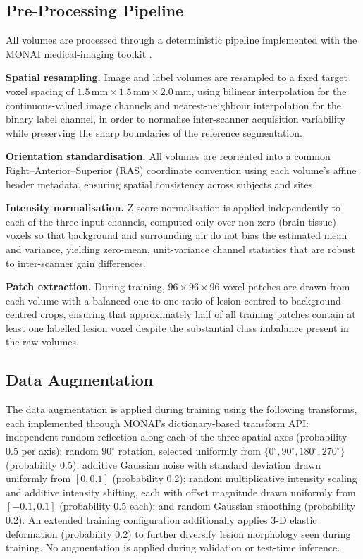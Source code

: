 \documentclass[pdflatex,sn-mathphys-num]{sn-jnl}
\begin{document}
\subsection{Pre-Processing Pipeline}\label{ssec:preproc}
All volumes are processed through a deterministic pipeline implemented
with the MONAI medical-imaging toolkit \citep{cardoso2022monai}.

\textbf{Spatial resampling.} Image and label volumes are resampled to
a fixed target voxel spacing of $1.5\,\text{mm} \times
1.5\,\text{mm} \times 2.0\,\text{mm}$, using bilinear interpolation
for the continuous-valued image channels and nearest-neighbour
interpolation for the binary label channel, in order to normalise
inter-scanner acquisition variability while preserving the sharp
boundaries of the reference segmentation.

\textbf{Orientation standardisation.} All volumes are reoriented into
a common Right--Anterior--Superior (RAS) coordinate convention using
each volume's affine header metadata, ensuring spatial consistency
across subjects and sites.

\textbf{Intensity normalisation.} Z-score normalisation is applied
independently to each of the three input channels, computed only over
non-zero (brain-tissue) voxels so that background and surrounding air
do not bias the estimated mean and variance, yielding zero-mean,
unit-variance channel statistics that are robust to inter-scanner gain
differences.

\textbf{Patch extraction.} During training, $96 \times 96 \times 96$-voxel patches are
drawn from each volume with a balanced one-to-one ratio of
lesion-centred to background-centred crops, ensuring that
approximately half of all training patches contain at least one
labelled lesion voxel despite the substantial class imbalance present
in the raw volumes.

\subsection{Data Augmentation}\label{ssec:augment}
The data augmentation is applied during training using the following
transforms, each implemented through MONAI's dictionary-based
transform API: independent random reflection along each of the three
spatial axes (probability 0.5 per axis); random $90^{\circ}$ rotation,
selected uniformly from $\{0^{\circ},90^{\circ},180^{\circ},
270^{\circ}\}$ (probability 0.5); additive Gaussian noise with
standard deviation drawn uniformly from $[0,0.1]$ (probability 0.2);
random multiplicative intensity scaling and additive intensity
shifting, each with offset magnitude drawn uniformly from
$[-0.1,0.1]$ (probability 0.5 each); and random Gaussian smoothing
(probability 0.2). An extended training configuration additionally
applies 3-D elastic deformation (probability 0.2) to further diversify
lesion morphology seen during training. No augmentation is applied
during validation or test-time inference.
\end{document}
